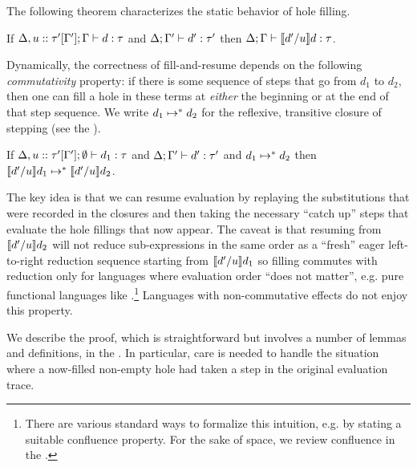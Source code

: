 

The following theorem characterizes the static behavior of hole filling.
\begin{thm}[Filling]
  If $\Delta, u :: \tau'[\Gamma']; \Gamma \vdash d : \tau$
  and $\Delta; \Gamma' \vdash d' : \tau'$
  then $\Delta; \Gamma \vdash \llbracket d' / u\rrbracket d : \tau$.
\end{thm}

Dynamically, the correctness of fill-and-resume depends on
the following \emph{commutativity} property: if there is some sequence of
steps that go from $d_1$ to $d_2$, then one can fill a hole in these
terms at \emph{either} the beginning or at the end of that step
sequence.
%
We write $d_1 \mapsto^* d_2$ for the reflexive,
transitive closure of stepping (see the \appendixName).
%
\begin{thm}[Commutativity]
  If $\Delta, u :: \tau'[\Gamma']; \emptyset \vdash d_1 : \tau$
  and $\Delta; \Gamma' \vdash d' : \tau'$ and $d_1 \mapsto^* d_2$
  then $\llbracket d' / u\rrbracket d_1 \mapsto^* \llbracket d' / u\rrbracket d_2$.
\end{thm}
%
The key idea is that we can resume evaluation by replaying the substitutions that were recorded in the closures and then taking the necessary ``catch up'' steps that evaluate the hole fillings that now appear.
%
The caveat is that resuming from $\llbracket d' / u\rrbracket d_2$ will not
reduce sub-expressions in the same order as a ``fresh'' eager left-to-right
reduction sequence starting from $\llbracket d' / u\rrbracket d_1$ so 
filling commutes with reduction only for 
languages where evaluation order ``does not matter'', e.g. pure functional languages like \HazelnutLive.\footnote{There are various standard ways to formalize this intuition, e.g. by stating a suitable confluence property. 
For the sake of space, we review confluence in the \appendixName.} Languages with non-commutative effects do not enjoy this property.


We describe the proof, which is straightforward but involves a
number of lemmas and definitions, in the \appendixName.
%
In particular, care is needed to handle the situation where a
now-filled non-empty hole had taken a step in the original evaluation trace.

